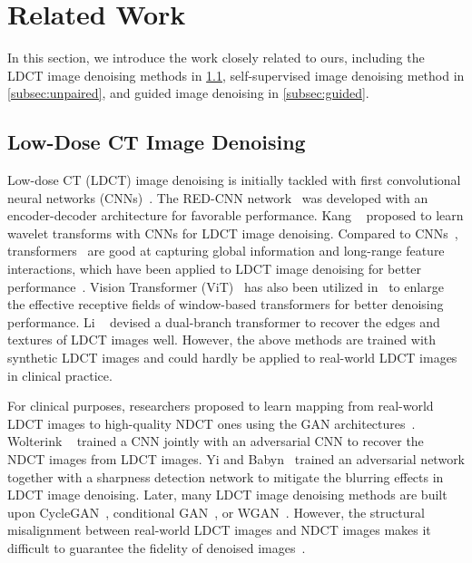 \section{Related Work}
\label{sec:relatedwork}
In this section, we introduce the work closely related to ours, including the LDCT image denoising methods in \cref{subsec:LDCT reconstruction}, self-supervised image denoising method in \cref{subsec:unpaired}, and guided image denoising in \cref{subsec:guided}.


\subsection{Low-Dose CT Image Denoising}
\label{subsec:LDCT reconstruction}
Low-dose CT (LDCT) image denoising is initially tackled with first convolutional neural networks (CNNs)~\cite{CZZ}. The RED-CNN network~\cite{chen2017low} was developed with an encoder-decoder architecture for favorable performance. Kang \etal~\cite{kang2017deep,kang2018deep} proposed to learn wavelet transforms with CNNs for LDCT image denoising.
%
Compared to CNNs~\cite{TMI1}, transformers~\cite{transformer} are good at capturing global information and long-range feature interactions, which have been applied to LDCT image denoising for better performance~\cite{wang2023ctformer}. Vision Transformer (ViT)~\cite{dosovitskiy2020image} has also been utilized in~\cite{wang2021ted,wang2023ctformer} to enlarge the effective receptive fields of window-based transformers for better denoising performance. Li \etal~\cite{li2022transformer} devised a dual-branch transformer to recover the edges and textures of LDCT images well.
However, the above methods are trained with synthetic LDCT images and could hardly be applied to real-world LDCT images in clinical practice.


For clinical purposes, researchers proposed to learn mapping from real-world LDCT images to high-quality NDCT ones using the GAN architectures~\cite{gan}. Wolterink \etal~\cite{wolterink2017generative} trained a CNN jointly with an adversarial CNN to recover the NDCT images from LDCT images. Yi and Babyn~\cite{yi2018sharpness} trained an adversarial network together with a sharpness detection network to mitigate the blurring effects in LDCT image denoising. Later, many LDCT image denoising methods are built upon CycleGAN~\cite{kang2019cycle,tang2019unpaired}, conditional GAN~\cite{hong2020end}, or WGAN~\cite{yang2018low,hu2019artifact}. However, the structural misalignment between real-world LDCT images and NDCT images makes it difficult to guarantee the fidelity of denoised images~\cite{kulathilake2023review}.

